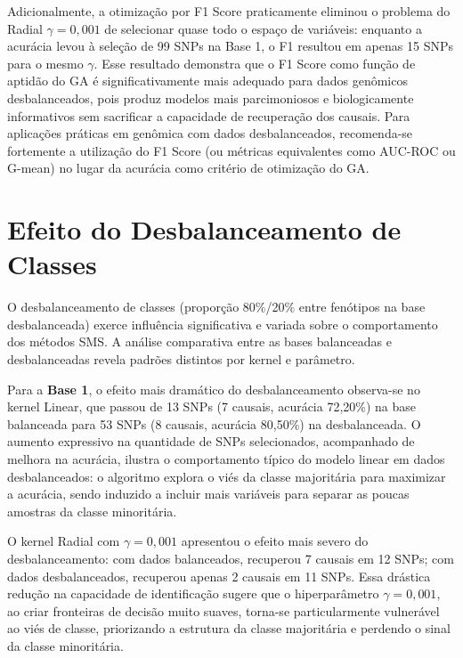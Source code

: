 \documentclass[12pt,a4paper]{article}
\newcommand{\novo}[1]{\textcolor{corNova}{#1}}
\begin{document}
\novo{Adicionalmente, a otimização por F1 Score praticamente eliminou o problema do Radial $\gamma = 0{,}001$ de selecionar quase todo o espaço de variáveis: enquanto a acurácia levou à seleção de 99 SNPs na Base 1, o F1 resultou em apenas 15 SNPs para o mesmo $\gamma$. Esse resultado demonstra que o F1 Score como função de aptidão do GA é significativamente mais adequado para dados genômicos desbalanceados, pois produz modelos mais parcimoniosos e biologicamente informativos sem sacrificar a capacidade de recuperação dos causais. Para aplicações práticas em genômica com dados desbalanceados, recomenda-se fortemente a utilização do F1 Score (ou métricas equivalentes como AUC-ROC ou G-mean) no lugar da acurácia como critério de otimização do GA.}

\section{\novo{Efeito do Desbalanceamento de Classes}}

\novo{O desbalanceamento de classes (proporção 80\%/20\% entre fenótipos na base desbalanceada) exerce influência significativa e variada sobre o comportamento dos métodos SMS. A análise comparativa entre as bases balanceadas e desbalanceadas revela padrões distintos por kernel e parâmetro.}

\novo{Para a \textbf{Base 1}, o efeito mais dramático do desbalanceamento observa-se no kernel Linear, que passou de 13 SNPs (7 causais, acurácia 72,20\%) na base balanceada para 53 SNPs (8 causais, acurácia 80,50\%) na desbalanceada. O aumento expressivo na quantidade de SNPs selecionados, acompanhado de melhora na acurácia, ilustra o comportamento típico do modelo linear em dados desbalanceados: o algoritmo explora o viés da classe majoritária para maximizar a acurácia, sendo induzido a incluir mais variáveis para separar as poucas amostras da classe minoritária.}

\novo{O kernel Radial com $\gamma = 0{,}001$ apresentou o efeito mais severo do desbalanceamento: com dados balanceados, recuperou 7 causais em 12 SNPs; com dados desbalanceados, recuperou apenas 2 causais em 11 SNPs. Essa drástica redução na capacidade de identificação sugere que o hiperparâmetro $\gamma = 0{,}001$, ao criar fronteiras de decisão muito suaves, torna-se particularmente vulnerável ao viés de classe, priorizando a estrutura da classe majoritária e perdendo o sinal da classe minoritária.}
\end{document}
